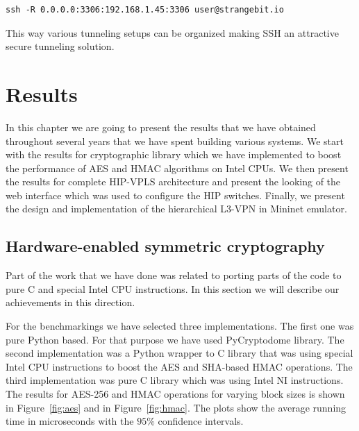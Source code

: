 \begin{verbatim}
ssh -R 0.0.0.0:3306:192.168.1.45:3306 user@strangebit.io
\end{verbatim}

This way various tunneling setups can be organized making SSH an attractive secure tunneling 
solution.

\chapter{Results}

In this chapter we are going to present the results that we have obtained 
throughout several years that we have spent building various systems. We start 
with the results for cryptographic library which we have implemented to 
boost the performance of AES and HMAC algorithms on Intel CPUs. We then 
present the results for complete HIP-VPLS architecture and present the 
looking of the web interface which was used to configure the HIP switches.
Finally, we present the design and implementation of the hierarchical L3-VPN
in Mininet emulator.  

\section{Hardware-enabled symmetric cryptography}

Part of the work that we have done was related to porting parts of the code to pure C 
and special Intel CPU instructions. In this section we will describe our achievements 
in this direction. 

For the benchmarkings we have selected three implementations. The first one was pure 
Python based. For that purpose we have used PyCryptodome library. The second implementation
was a Python wrapper to C library that was using special Intel CPU instructions to boost 
the AES and SHA-based HMAC operations. The third implementation was pure C library 
which was using Intel NI instructions. The results for AES-256 and HMAC operations 
for varying block sizes is shown in Figure~\ref{fig:aes} and in Figure~\ref{fig:hmac}. The plots show the average 
running time in microseconds with the $95\%$ confidence intervals. 

